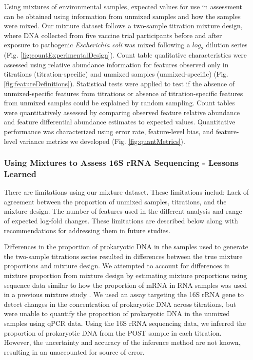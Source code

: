 \documentclass[linenumbers]{bmcart}
\begin{document}
Using mixtures of environmental samples, expected values for use in assessment can be obtained using information from unmixed samples and how the samples were mixed.
Our mixture dataset follows a
two-sample titration mixture design, where DNA collected from five vaccine trial participants before and
after exposure to pathogenic \emph{Escherichia coli}  was mixed following a \(log_2\) dilution
series (Fig. \ref{fig:countExperimentalDesign}).
Count table qualitative characteristics were assessed using relative abundance information for
features observed only in titrations (titration-specific) and unmixed samples (unmixed-specific) (Fig. \ref{fig:featureDefinitions}).
Statistical tests were applied to test if the absence of unmixed-specific features from titrations or absence of titration-specific features from unmixed samples could be explained by random sampling.
Count tables were quantitatively assessed by comparing observed feature relative abundance and feature differential abundance estimates to expected values.
Quantitative performance was characterized using error rate, feature-level bias, and feature-level variance metrics we developed (Fig. \ref{fig:quantMetrics}).

\subsubsection*{Using Mixtures to Assess 16S rRNA Sequencing - Lessons Learned}

There are limitations using our mixture dataset. These limitations
includ: Lack of agreement between the proportion of unmixed samples,
titrations, and the mixture design. The number of features used in the
different analysis and range of expected log-fold changes.
These limitations are described below along with
recommendations for addressing them in future studies.

Differences in the proportion of prokaryotic DNA in the samples used to
generate the two-sample titrations series resulted in differences
between the true mixture proportions and mixture design. We attempted to
account for differences in mixture proportion from mixture design by
estimating mixture proportions using sequence data similar to how the
proportion of mRNA in RNA samples was used in a previous mixture study
\cite{parsons2015using}. We used an assay targeting the 16S rRNA gene
to detect changes in the concentration of prokaryotic DNA across
titrations, but were unable to quantify the proportion of prokaryotic
DNA in the unmixed samples using qPCR data. Using the 16S rRNA sequencing
data, we inferred the proportion of prokaryotic DNA from the POST sample
in each titration. However, the uncertainty and accuracy of the
inference method are not known, resulting in an unaccounted for source of error.
\end{document}
